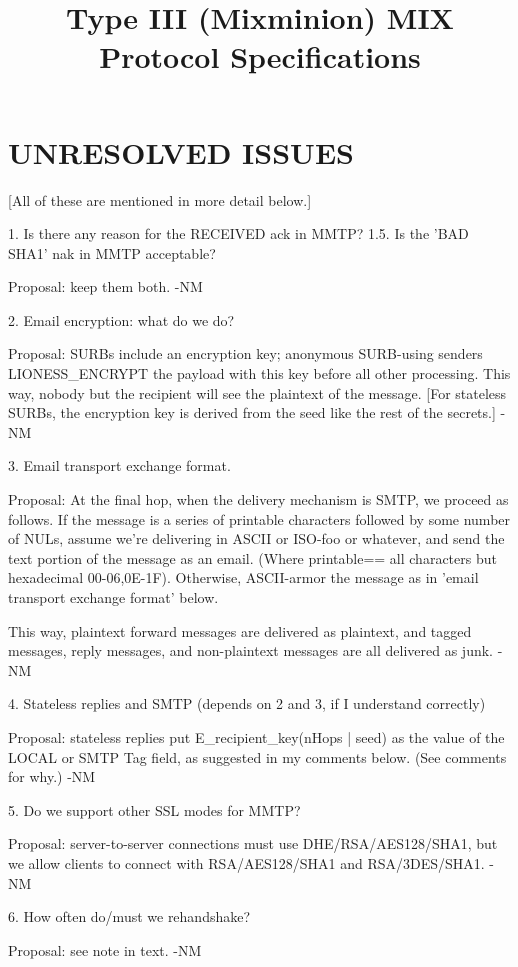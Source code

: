 \title{Type III (Mixminion) MIX Protocol Specifications}

\section{UNRESOLVED ISSUES}

[All of these are mentioned in more detail below.]

1. Is there any reason for the RECEIVED ack in MMTP?
1.5. Is the 'BAD SHA1' nak in MMTP acceptable?

   Proposal: keep them both. -NM

2. Email encryption: what do we do?

   Proposal: SURBs include an encryption key; anonymous SURB-using
   senders LIONESS_ENCRYPT the payload with this key before all other
   processing.  This way, nobody but the recipient will see the
   plaintext of the message. [For stateless SURBs, the encryption key
   is derived from the seed like the rest of the secrets.] -NM

3. Email transport exchange format.

   Proposal: At the final hop, when the delivery mechanism is SMTP, we
   proceed as follows.  If the message is a series of printable
   characters followed by some number of NULs, assume we're
   delivering in ASCII or ISO-foo or whatever, and send the text
   portion of the message as an email.   (Where printable==
   {all characters but hexadecimal 00-06,0E-1F}).  Otherwise,
   ASCII-armor the message as in 'email transport exchange format'
   below.

   This way, plaintext forward messages are delivered as plaintext,
   and tagged messages, reply messages, and non-plaintext messages are
   all delivered as junk. -NM

4. Stateless replies and SMTP (depends on 2 and 3, if I understand correctly)

   Proposal: stateless replies put E_recipient_key(nHops | seed) as
   the value of the LOCAL or SMTP Tag field, as suggested in my
   comments below.  (See comments for why.) -NM

5. Do we support other SSL modes for MMTP?

   Proposal: server-to-server connections must use DHE/RSA/AES128/SHA1, 
   but we allow clients to connect with RSA/AES128/SHA1 and
   RSA/3DES/SHA1.  -NM
   
6. How often do/must we rehandshake?

   Proposal: see note in text. -NM


